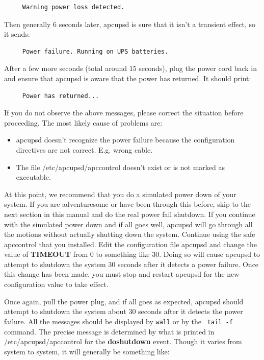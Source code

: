 {{\footnotesize
\begin{verbatim}
     Warning power loss detected.
\end{verbatim}
\normalsize

Then generally 6 seconds later, apcupsd is sure that it isn't a transient
effect, so it sends: 

\footnotesize
\begin{verbatim}
     Power failure. Running on UPS batteries.
\end{verbatim}
\normalsize

After a few more seconds (total around 15 seconds), plug the power cord back
in and ensure that apcupsd is aware that the power has returned. It should
print: 

\footnotesize
\begin{verbatim}
     Power has returned...
\end{verbatim}
\normalsize

If you do not observe the above messages, please correct the situation before
proceeding. The most likely cause of problems are:  

\begin{itemize}
\item apcupsd doesn't recognize the power failure because the configuration
   directives are not correct. E.g. wrong cable.  
\item The file /etc/apcupsd/apccontrol doesn't exist or is not marked as
   executable. 
   \end{itemize}

At this point, we recommend that you do a simulated power down of your system.
If you are adventuresome or have been through this before, skip to the next
section in this manual and do the real power fail shutdown. If you continue
with the simulated power down and if all goes well, apcupsd will go through
all the motions without actually shutting down the system. Continue using the
safe apccontrol that you installed. Edit the configuration file apcupsd and
change the value of {\bf TIMEOUT} from 0 to something like 30. Doing so will
cause apcupsd to attempt to shutdown the system 30 seconds after it detects a
power failure. Once this change has been made, you must stop and restart
apcupsd for the new configuration value to take effect.  

Once again, pull the power plug, and if all goes as expected, apcupsd should
attempt to shutdown the system about 30 seconds after it detects the power
failure. All the messages should be displayed by {\tt wall} or by the {\tt
tail -f} command. The precise message is determined by what is printed in
/etc/apcupsd/apccontrol for the {\bf doshutdown} event.  Though it varies from
system to system, it will generally be something like: 

}}
